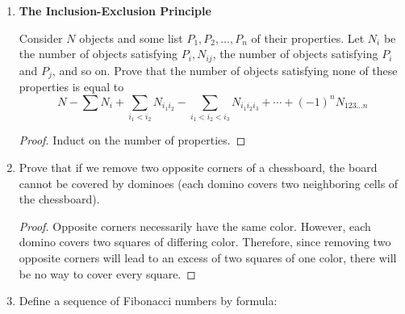 \documentclass[../apprentice.tex]{subfiles}
\begin{document}
\begin{enumerate}
\begin{enumerate}
\begin{proof}
            \begin{align*}
                g_1g_2 &= eg_1g_2e\tag*{Identity}\\
                &= (g_1^{-1}g_1)(g_1g_2)(g_2g_2^{-1})\tag*{Inverse}\\
                &= g_1^{-1}g_1^2g_2^2g_2^{-1}\tag*{Associativity}\\
                &= g_1^{-1}eeg_2^{-1}\tag*{Property}\\
                &= g_1^{-1}g_2^{-1}\tag*{Identity}\\
                &= (g_2g_1)^{-1}\tag*{Part (a)}\\
                &= (g_2g_1)^{-1}e\tag*{Identity}\\
                &= (g_2g_1)^{-1}(g_2g_1)^{-1}(g_2g_1)\tag*{Inverse}\\
                &= eg_2g_1\tag*{Property}\\
                &= g_2g_1\tag*{Identity}
            \end{align*}
            as desired.
        \end{proof}
    \end{enumerate}
    \item \textbf{The Inclusion-Exclusion Principle}\par
    Consider $N$ objects and some list $P_1,P_2,\dots,P_n$ of their properties. Let $N_i$ be the number of objects satisfying $P_i,N_{ij}$, the number of objects satisfying $P_i$ and $P_j$, and so on. Prove that the number of objects satisfying none of these properties is equal to
    \begin{equation*}
        N-\sum N_i+\sum_{i_1<i_2}N_{i_1i_2}-\sum_{i_1<i_2<i_3}N_{i_1i_2i_3}+\cdots+(-1)^nN_{123\dots n}
    \end{equation*}
    \begin{proof}
        Induct on the number of properties.
    \end{proof}
    \item Prove that if we remove two opposite corners of a chessboard, the board cannot be covered by dominoes (each domino covers two neighboring cells of the chessboard).
    \begin{proof}
        Opposite corners necessarily have the same color. However, each domino covers two squares of differing color. Therefore, since removing two opposite corners will lead to an excess of two squares of one color, there will be no way to cover every square.
    \end{proof}
    \item Define a sequence of Fibonacci numbers by formula:

\end{enumerate}
\end{document}

